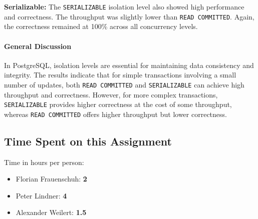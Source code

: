 \documentclass[11pt]{scrartcl}
\begin{document}
\textbf{Serializable:}
The \lstinline[style=dbtsql]{SERIALIZABLE} isolation level also showed high performance and correctness.
The throughput was slightly lower than \lstinline[style=dbtsql]{READ COMMITTED}.
Again, the correctness remained at 100\% across all concurrency levels.

\paragraph{General Discussion}
In PostgreSQL, isolation levels are essential for maintaining data consistency and integrity.
The results indicate that for simple transactions involving a small number of updates, both
\lstinline[style=dbtsql]{READ COMMITTED} and \lstinline[style=dbtsql]{SERIALIZABLE} can achieve high throughput and correctness.
However, for more complex transactions, \lstinline[style=dbtsql]{SERIALIZABLE} provides higher correctness at the cost of some throughput,
whereas \lstinline[style=dbtsql]{READ COMMITTED} offers higher throughput but lower correctness.

\subsection*{Time Spent on this Assignment}

Time in hours per person:

\begin{itemize}
  \item Florian Frauenschuh: \textbf{2}
  \item Peter Lindner: \textbf{4}
  \item Alexander Weilert: \textbf{1.5}
\end{itemize}

\printbibliography[title=References]
\end{document}
